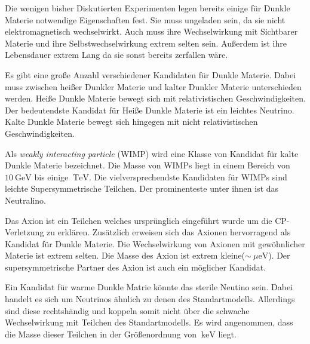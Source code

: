 Die wenigen bisher Diskutierten Experimenten legen bereits einige für Dunkle Materie notwendige Eigenschaften fest.
Sie muss ungeladen sein, da sie nicht elektromagnetisch wechselwirkt.
Auch muss ihre Wechselwirkung mit Sichtbarer Materie und ihre Selbstwechselwirkung extrem selten sein.
Außerdem ist ihre Lebensdauer extrem Lang da sie sonst bereits zerfallen wäre.

Es gibt eine große Anzahl verschiedener Kandidaten für Dunkle Materie.
Dabei muss zwischen heißer Dunkler Materie und kalter Dunkler Materie unterschieden werden.
Heiße Dunkle Materie bewegt sich mit relativistischen Geschwindigkeiten.
Der bedeutendste Kandidat für Heiße Dunkle Materie ist ein leichtes Neutrino.
Kalte Dunkle Materie bewegt sich hingegen mit nicht relativistischen Geschwindigkeiten.

Als \textit{weakly interacting particle} (WIMP) wird eine Klasse von Kandidat für kalte Dunkle Materie bezeichnet.
Die Masse von WIMPs liegt in einem Bereich von $\SI{10}{\giga\electronvolt}$ bis einige $\SI{}{\tera\electronvolt}$.
Die vielversprechendste Kandidaten für WIMPs sind leichte Supersymmetrische Teilchen.
Der prominenteste unter ihnen ist das Neutralino.\cite{DMCandidates}

Das Axion ist ein Teilchen welches ursprünglich eingeführt wurde um die CP-Verletzung zu erklären.
Zusätzlich erweisen sich das Axionen hervorragend als Kandidat für Dunkle Materie.
Die Wechselwirkung von Axionen mit gewöhnlicher Materie ist extrem selten.
Die Masse des Axion ist extrem kleine($\sim\SI{}{\mu\electronvolt}$).
Der supersymmetrische Partner des Axion ist auch ein möglicher Kandidat.

Ein Kandidat für warme Dunkle Matrie könnte das sterile Neutino sein.
Dabei handelt es sich um Neutrinos ähnlich zu denen des Standartmodells.
Allerdings sind diese rechtshändig und koppeln somit nicht über die schwache Wechselwirkung mit Teilchen des Standartmodells.
Es wird angenommen, dass die Masse dieser Teilchen in der Größenordnung von $\SI{}{\kilo\electronvolt}$ liegt.\cite{Drewes}